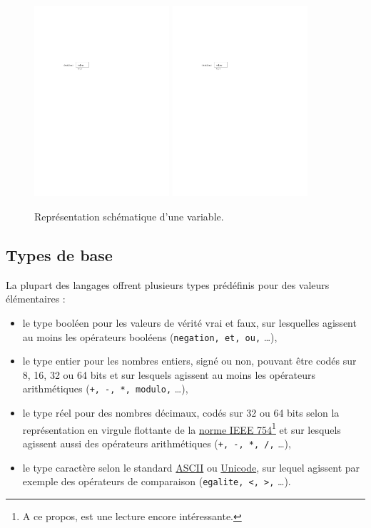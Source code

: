\documentclass[a4paper,francais]{insalyon}
\begin{document}
\begin{figure}[htbp]
  \centering
  \includegraphics[width=5cm,page=1]{variable} \hspace{1cm}
  \includegraphics[width=5cm,page=2]{variable}
  \caption{Représentation schématique d'une variable.}
  \label{fig:var}
\end{figure}

\subsection{Types de base}

La plupart des langages offrent plusieurs types prédéfinis pour des valeurs élémentaires :
\begin{itemize}
\item le type booléen pour les valeurs de vérité vrai et faux, sur lesquelles agissent au moins les opérateurs booléens (\verb!negation, et, ou,! \ldots),
\item le type entier pour les nombres entiers, signé ou non, pouvant être codés sur 8, 16, 32 ou 64 bits et sur lesquels agissent au moins les opérateurs arithmétiques (\verb!+, -, *, modulo,! \ldots), 
\item le type réel pour des nombres décimaux, codés sur 32 ou 64 bits selon la représentation en virgule flottante de la \href{https://fr.wikipedia.org/wiki/IEEE_754}{norme IEEE 754}\footnote{A ce propos, \cite{goldberg91} est une lecture encore intéressante.} et sur lesquels agissent aussi des opérateurs arithmétiques (\verb!+, -, *, /,! \ldots),
\item le type caractère selon le standard \href{https://fr.wikipedia.org/wiki/American_Standard_Code_for_Information_Interchange}{ASCII} ou \href{https://fr.wikipedia.org/wiki/Unicode}{Unicode}, sur lequel agissent par exemple des opérateurs de comparaison (\verb!egalite, <, >,! \ldots).
\end{itemize}
\end{document}
